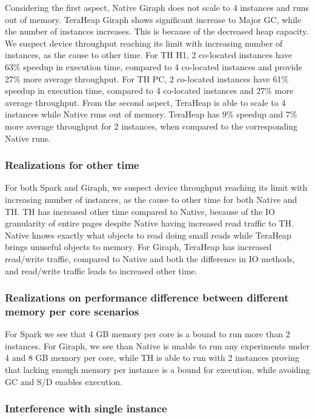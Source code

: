 Considering the first aspect, Native Giraph does not scale to 4 instances and runs out of memory. TeraHeap Giraph shows significant increase to Major GC, while the number of instances increases. This is because of the decreased heap capacity. We suspect device throughput reaching its limit with increasing number of instances, as the cause to other time. For TH H1, 2 co-located instances have 63\% speedup in execution time, compared to 4 co-located instances and provide 27\% more average throughput. For TH PC, 2 co-located instances have 61\% speedup in execution time, compared to 4 co-located instances and 27\% more average throughput. From the second aspect, TeraHeap is able to scale to 4 instances while Native runs out of memory. TeraHeap has 9\% speedup and 7\% more average throughput for 2 instances, when compared to the corresponding Native runs.

\subsubsection{Realizations for other time}
For both Spark and Giraph, we suspect device throughput reaching its limit with increasing number of instances, as the cause to other time for both Native and TH. TH has increased other time compared to Native, because of the IO granularity of entire pages despite Native having increased read traffic to TH. Native knows exactly what objects to read doing small reads while TeraHeap brings unuseful objects to memory. For Giraph, TeraHeap has increased read/write traffic, compared to Native and both the difference in IO methods, and read/write traffic leads to increased other time.

\subsubsection{Realizations on performance difference between different memory per core scenarios}
For Spark we see that 4 GB memory per core is a bound to run more than 2 instances. For Giraph, we see than Native is unable to run any experiments under 4 and 8 GB memory per core, while TH is able to run with 2 instances proving that lacking enough memory per instance is a bound for execution, while avoiding GC and S/D enables execution.

\subsubsection{Interference with single instance}

